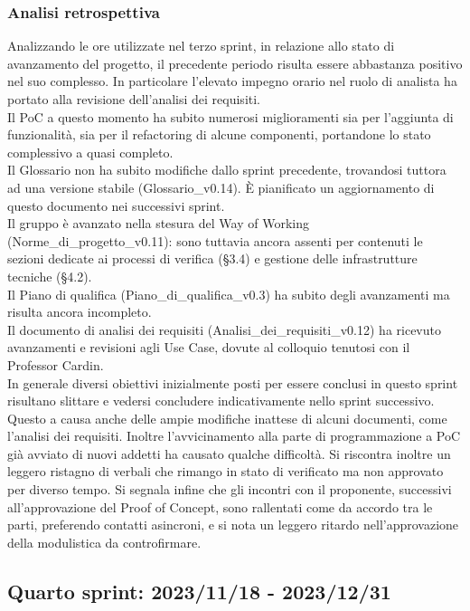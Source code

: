 \newpage
\subsubsection{Analisi retrospettiva}
Analizzando le ore utilizzate nel terzo sprint, in relazione allo stato di avanzamento del progetto, il precedente periodo risulta essere abbastanza positivo nel suo complesso. In particolare l'elevato impegno orario nel ruolo di analista ha portato alla revisione dell'analisi dei requisiti.\\ Il PoC a questo momento ha subito numerosi miglioramenti sia per l'aggiunta di funzionalità, sia per il refactoring di alcune componenti, portandone lo stato complessivo a quasi completo.\\ Il Glossario non ha subito modifiche dallo sprint precedente, trovandosi tuttora ad una versione stabile (Glossario\_v0.14). È pianificato un aggiornamento di questo documento nei successivi sprint.\\ Il gruppo è avanzato nella stesura del Way of Working (Norme\_di\_progetto\_v0.11): sono tuttavia ancora assenti per contenuti le sezioni dedicate ai processi di verifica (§3.4) e gestione delle infrastrutture tecniche (§4.2).\\ Il Piano di qualifica (Piano\_di\_qualifica\_v0.3) ha subito degli avanzamenti ma risulta ancora incompleto.\\ Il documento di analisi dei requisiti (Analisi\_dei\_requisiti\_v0.12) ha ricevuto avanzamenti e revisioni agli Use Case, dovute al colloquio tenutosi con il Professor Cardin.\\ In generale diversi obiettivi inizialmente posti per essere conclusi in questo sprint risultano slittare e vedersi concludere indicativamente nello sprint successivo. Questo a causa anche delle ampie modifiche inattese di alcuni documenti, come l’analisi dei requisiti. Inoltre l’avvicinamento alla parte di programmazione a PoC già avviato di nuovi addetti ha causato qualche difficoltà. Si riscontra inoltre un leggero ristagno di verbali che rimango in stato di verificato ma non approvato per diverso tempo. Si segnala infine che gli incontri con il proponente, successivi all'approvazione del Proof of Concept, sono rallentati come da accordo tra le parti, preferendo contatti asincroni, e si nota un leggero ritardo nell'approvazione della modulistica da controfirmare.
\newpage


\subsection{Quarto sprint: 2023/11/18 - 2023/12/31}

